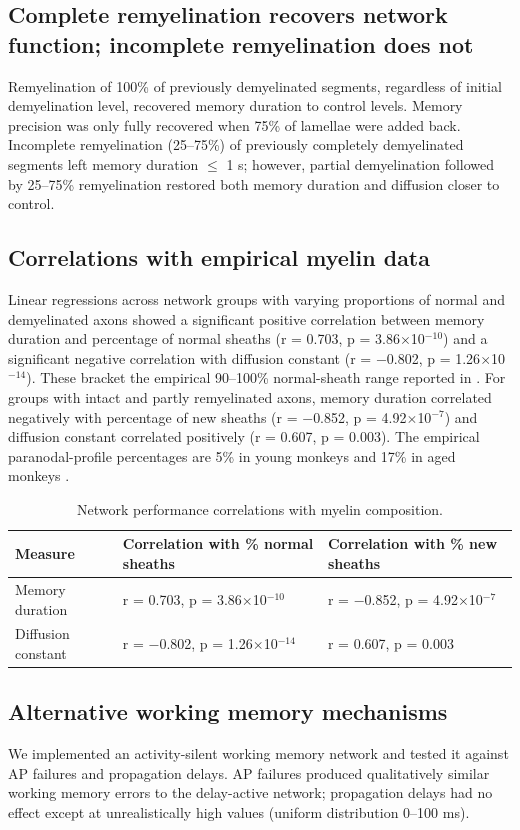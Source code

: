 \documentclass[11pt]{article}
\begin{document}
\subsection{Complete remyelination recovers network function; incomplete remyelination does not}
Remyelination of 100\% of previously demyelinated segments, regardless of initial demyelination level, recovered memory duration to control levels. Memory precision was only fully recovered when 75\% of lamellae were added back. Incomplete remyelination (25--75\%) of previously completely demyelinated segments left memory duration $\leq$ 1 s; however, partial demyelination followed by 25--75\% remyelination restored both memory duration and diffusion closer to control.

\subsection{Correlations with empirical myelin data}
Linear regressions across network groups with varying proportions of normal and demyelinated axons showed a significant positive correlation between memory duration and percentage of normal sheaths (r = 0.703, p = 3.86$\times$10$^{-10}$) and a significant negative correlation with diffusion constant (r = $-$0.802, p = 1.26$\times$10$^{-14}$). These bracket the empirical 90--100\% normal-sheath range reported in \cite{peters2002effects}. For groups with intact and partly remyelinated axons, memory duration correlated negatively with percentage of new sheaths (r = $-$0.852, p = 4.92$\times$10$^{-7}$) and diffusion constant correlated positively (r = 0.607, p = 0.003). The empirical paranodal-profile percentages are 5\% in young monkeys and 17\% in aged monkeys \cite{peters2003effects}.

\begin{table}[h]
\centering
\caption{Network performance correlations with myelin composition.}
\begin{tabular}{lll}
\toprule
Measure & Correlation with \% normal sheaths & Correlation with \% new sheaths \\
\midrule
Memory duration & r = 0.703, p = 3.86$\times$10$^{-10}$ & r = $-$0.852, p = 4.92$\times$10$^{-7}$ \\
Diffusion constant & r = $-$0.802, p = 1.26$\times$10$^{-14}$ & r = 0.607, p = 0.003 \\
\bottomrule
\end{tabular}
\end{table}

\subsection{Alternative working memory mechanisms}
We implemented an activity-silent working memory network \cite{mongillo2008synaptic,stokes2015activitysilent,barbosa2020interplay} and tested it against AP failures and propagation delays. AP failures produced qualitatively similar working memory errors to the delay-active network; propagation delays had no effect except at unrealistically high values (uniform distribution 0--100 ms).
\end{document}
